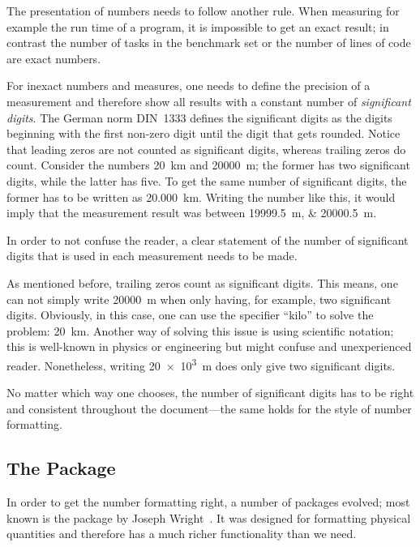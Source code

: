 The presentation of numbers needs to follow another rule.  When measuring for
example the run time of a program, it is impossible to get an exact result; in
contrast the number of tasks in the benchmark set or the number of lines of code
are exact numbers.

For inexact numbers and measures, one needs to define the precision of a
measurement and therefore show all results with a constant number of
\emph{significant digits}.  The German norm DIN~1333 defines the significant
digits as the digits beginning with the first non-zero digit until the digit
that gets rounded.  Notice that leading zeros are not counted as significant
digits, whereas trailing zeros do count.  Consider the numbers
\SI{20}{\kilo\meter} and \SI{20000}{\meter}; the former has two significant
digits, while the latter has five.  To get the same number of significant
digits, the former has to be written as \SI{20.000}{\kilo\meter}.  Writing the
number like this, it would imply that the measurement result was between
\SIlist{19999.5;20000.5}{\meter}.

In order to not confuse the reader, a clear statement of the number of
significant digits that is used in each measurement needs to be made.

As mentioned before, trailing zeros count as significant digits.  This means,
one can not simply write \SI{20000}{\meter} when only having, for example, two
significant digits.  Obviously, in this case, one can use the specifier
\enquote{kilo} to solve the problem: \SI{20}{\kilo\meter}.  Another way of
solving this issue is using scientific notation; this is well-known in physics
or engineering but might confuse and unexperienced reader.  Nonetheless, writing
\SI{20e3}{\meter} does only give two significant digits.

No matter which way one chooses, the number of significant digits has to be
right and consistent throughout the document—the same holds for the style of
number formatting.

\subsection{The Package }

In order to get the number formatting right, a number of packages evolved; most
known is the  package by Joseph Wright~\cite{Wright2016}.  It
was designed for formatting physical quantities and therefore has a much richer
functionality than we need.

